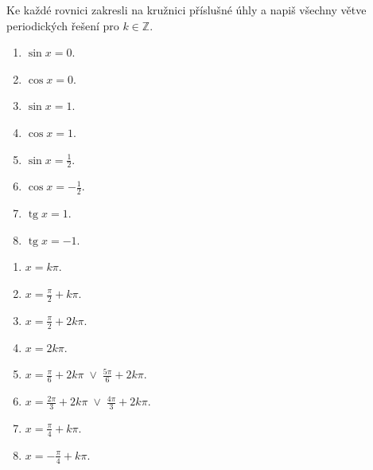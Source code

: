 \documentclass[11pt,a4paper]{article}
\begin{document}
Ke každé rovnici zakresli na kružnici příslušné úhly a napiš všechny větve periodických řešení pro $k\in\mathbb Z$.
\begin{zadaniReseniBox}[title={Domácí úkol}]
\begin{enumerate}[label=\alph*)]
\item $\sin x=0$.
\item $\cos x=0$.
\item $\sin x=1$.
\item $\cos x=1$.
\item $\sin x=\frac{1}{2}$.
\item $\cos x=-\frac{1}{2}$.
\item $\operatorname{tg}x=1$.
\item $\operatorname{tg}x=-1$.
\end{enumerate}
\tcblower
\begin{enumerate}[label=\alph*)]
\item $x=k\pi$.
\item $x=\frac{\pi}{2}+k\pi$.
\item $x=\frac{\pi}{2}+2k\pi$.
\item $x=2k\pi$.
\item $x=\frac{\pi}{6}+2k\pi\;\lor\;\frac{5\pi}{6}+2k\pi$.
\item $x=\frac{2\pi}{3}+2k\pi\;\lor\;\frac{4\pi}{3}+2k\pi$.
\item $x=\frac{\pi}{4}+k\pi$.
\item $x=-\frac{\pi}{4}+k\pi$.
\end{enumerate}
\end{zadaniReseniBox}
\end{document}

